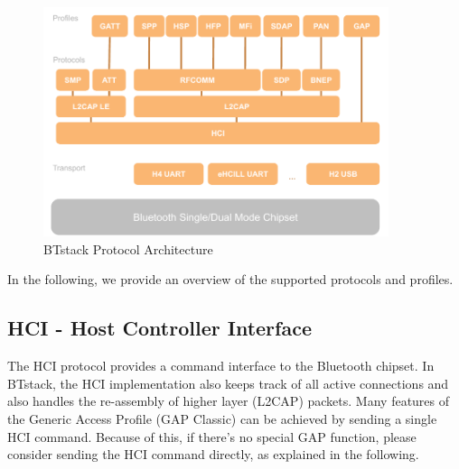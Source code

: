 \begin{figure}[htbp] %
   \centering
   \includegraphics[width=0.9\textwidth]{picts/btstack-protocols.pdf} 
   \caption{BTstack Protocol Architecture}
   \label{fig:BTstackProtocolArchitecture}
\end{figure}


In the following, we provide an overview of the supported protocols and profiles.




\subsection{HCI - Host Controller Interface}

The HCI protocol provides a command interface to the Bluetooth chipset. In BTstack, the HCI implementation also keeps track of all active connections and also handles the re-assembly of higher layer (L2CAP) packets. Many features of the Generic Access Profile (GAP Classic) can be achieved by sending a single HCI command. Because of this, if there's no special GAP function, please consider sending the HCI command directly, as explained in the following. 

